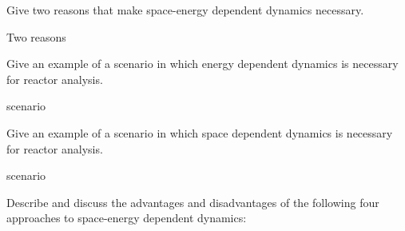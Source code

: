 \documentclass[11pt,addpoints,answers]{exam}
\begin{document}
\begin{questions}

        \question[20] Give two reasons that make space-energy dependent 
        dynamics necessary. 
                \begin{solution}
                        Two reasons
                \end{solution}


        \question[10] Give an example of a scenario in which energy dependent 
        dynamics is necessary for reactor analysis.
                \begin{solution}
                        scenario
                \end{solution}



        \question[10] Give an example of a scenario in which space dependent 
        dynamics is necessary for reactor analysis.
                \begin{solution}
                        scenario
                \end{solution}




        \question Describe and discuss the advantages and disadvantages of the 
        following four approaches to space-energy dependent dynamics:
\end{questions}
\end{document}
